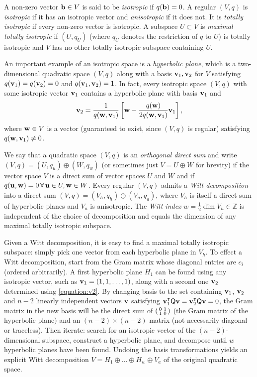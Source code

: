 \documentclass[11pt,a4paper]{article}
\begin{document}
A non-zero vector $\vb{b}\in V$ is said to be \emph{isotropic} if $q(\vb{b})=0$. 
A regular $(V,q)$ is \emph{isotropic} if it has an isotropic vector and \emph{anisotropic} if it does not. It is \emph{totally isotropic} if every non-zero vector is isotropic. 
A subspace $U \subset V$ is \emph{maximal totally isotropic} if $(U,q_U)$ (where $q_U$ denotes the restriction of $q$ to $U$) is totally isotropic and $V$ has no other totally isotropic subspace containing $U$. 

An important example of an isotropic space is a \emph{hyperbolic plane}, which is a two-dimensional quadratic space $(V,q)$ along with a basis $\vb{v}_1, \vb{v}_2$ for $V$ satisfying ${q(\vb{v}_1)=q(\vb{v}_2)=0}$ and $q(\vb{v}_1,\vb{v}_2)=1$. In fact, every isotropic space $(V,q)$ with some isotropic vector $\vb{v}_1$ contains a hyperbolic plane with basis $\vb{v}_1$ and
\begin{equation}
	\vb{v}_2=\frac{1}{q(\vb{w},\vb{v}_1)}\left[\vb{w}-\frac{q(\vb{w})}{2q(\vb{w},\vb{v}_1)}\vb{v}_1\right],\label{equation:v2}
\end{equation}
where $\vb{w}\in V$ is a vector (guaranteed to exist, since $(V,q)$ is regular) satisfying $q(\vb{w},\vb{v}_1)\neq0$.

We say that a quadratic space $(V,q)$ is an {\em orthogonal direct sum} and write $(V,q)=(U,q_u)\oplus(W,q_w)$ (or sometimes just $V = U\oplus W$ for brevity) if the vector space $V$ is a direct sum of vector spaces $U$ and $W$ and if $q(\vb{u},\vb{w})=0\,\forall\,\vb{u}\in U,\vb{w}\in W$. Every regular $(V,q)$ admits a \emph{Witt decomposition} into a direct sum $(V,q)=(V_h,q_h)\oplus(V_a,q_a)$, where $V_h$ is itself a direct sum of hyperbolic planes and $V_a$ is anisotropic. The \emph{Witt index} $w=\frac{1}{2}\dim V_h \in \mathbb{Z}$ is independent of the choice of decomposition and equals the dimension of 
any maximal totally isotropic subspace.

Given a Witt decomposition, it is easy to find a maximal
totally isotropic subspace:  simply pick one vector from each hyperbolic plane in $V_h$.
To effect a Witt decomposition, start from the Gram matrix whose diagonal entries are $c_i$ (ordered arbitrarily). A first hyperbolic plane $H_1$ can be found using any isotropic vector, such as $
\vb{v}_1=(1,1,\dots,1)$, 
along with a second one $\vb{v}_2$ determined using \cref{equation:v2}. By changing basis to the set containing $\vb{v}_1$, $\vb{v}_2$ and $n-2$ linearly independent vectors $\vb{v}$ satisfying $\vb{v}_1^\intercal\mathsf{Q}\vb{v}=\vb{v}_2^\intercal\mathsf{Q}\vb{v}=0$, the Gram matrix in the new basis will be the direct sum of $\begin{psmallmatrix}0&1\\1&0\end{psmallmatrix}$ (the Gram matrix of the hyperbolic plane) and an $(n-2)\times(n-2)$ matrix (not necessarily diagonal or traceless). Then iterate: search for an isotropic vector of the $(n-2)$-dimensional subspace, construct a hyperbolic plane, and decompose until $w$ hyperbolic planes have been found. Undoing the basis transformations yields an explicit Witt decomposition $V=H_1\oplus\dots\oplus H_w\oplus V_a$ of the original quadratic space.
\end{document}
